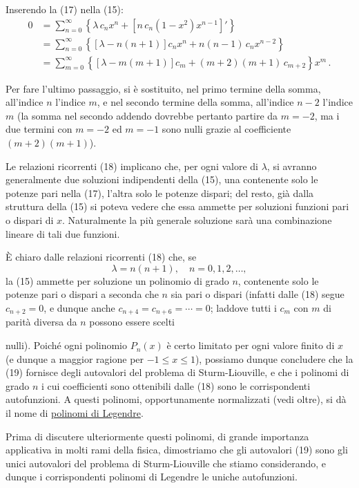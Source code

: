 \documentclass[11pt, a4paper]{book}
\numberwithin{equation}{section}
\begin{document}
Inserendo la (17) nella (15):
\begin{align*}
0 &= \sum_{n=0}^{\infty} \left\{ \lambda\, c_n x^n + \left[n\, c_n (1-x^2) x^{n-1}\right]' \right\} \\
&= \sum_{n=0}^{\infty} \left\{ \left[\lambda - n(n+1)\right] c_n x^n + n(n-1)\, c_n x^{n-2} \right\} \\
&= \sum_{m=0}^{\infty} \left\{ \left[\lambda - m(m+1)\right] c_m + (m+2)(m+1)\, c_{m+2} \right\} x^m \,.
\end{align*}

Per fare l'ultimo passaggio, si è sostituito, nel primo termine della somma, all'indice $n$ l'indice $m$,
e nel secondo termine della somma, all'indice $n-2$ l'indice $m$ (la somma nel secondo addendo dovrebbe pertanto partire da $m = -2$, ma i due termini con $m=-2$ ed $m=-1$ sono nulli grazie al coefficiente $(m+2)(m+1)$).

Le relazioni ricorrenti (18) implicano che, per ogni valore di $\lambda$,
si avranno generalmente due soluzioni indipendenti della (15), una contenente
solo le potenze pari nella (17), l'altra solo le potenze dispari; del
resto, già dalla struttura della (15) si poteva vedere che essa ammette
per soluzioni funzioni pari o dispari di $x$. Naturalmente la più generale
soluzione sarà una combinazione lineare di tali due funzioni.

È chiaro dalle relazioni ricorrenti (18) che, se
\begin{equation}
\lambda = n(n+1), \quad n = 0,1,2,\ldots, \tag{19}
\end{equation}
la (15) ammette per soluzione un polinomio di grado $n$, contenente solo
le potenze pari o dispari a seconda che $n$ sia pari o dispari (infatti dalle
(18) segue $c_{n+2} = 0$, e dunque anche $c_{n+4} = c_{n+6} = \cdots = 0$;
laddove tutti i $c_m$ con $m$ di parità diversa da $n$ possono essere scelti


nulli). Poiché ogni polinomio $P_n(x)$ è certo limitato per ogni
valore finito di $x$ (e dunque a maggior ragione per $-1 \leq x \leq 1$),
possiamo dunque concludere che la (19) fornisce degli autovalori del
problema di Sturm-Liouville, e che i polinomi di grado $n$ i cui coefficienti
sono ottenibili dalle (18) sono le corrispondenti autofunzioni. A
questi polinomi, opportunamente normalizzati (vedi oltre), si dà il
nome di \underline{polinomi di Legendre}.

Prima di discutere ulteriormente questi polinomi, di grande
importanza applicativa in molti rami della fisica, dimostriamo che gli
autovalori (19) sono gli unici autovalori del problema di Sturm-Liouville
che stiamo considerando, e dunque i corrispondenti polinomi di Legendre
le uniche autofunzioni.
\end{document}
